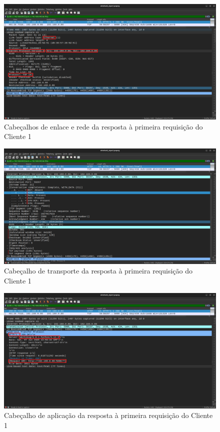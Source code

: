 \documentclass[conference,compsoc]{IEEEtran}
\begin{document}
\begin{otherlanguage}{brazil}
\begin{figure}[!h]
\centering
\includegraphics[width=\columnwidth]{../media/05-server_link_network.png}
\caption{Cabeçalhos de enlace e rede da resposta à primeira requisição do Cliente 1}
\label{fig:link_network_headers}
\end{figure}

\begin{figure}[!h]
\centering
\includegraphics[width=\columnwidth]{../media/06-server_transport.png}
\caption{Cabeçalho de transporte da resposta à primeira requisição do Cliente 1}
\label{fig:transport_header}
\end{figure}

\begin{figure}[!h]
\centering
\includegraphics[width=\columnwidth]{../media/07-server_application.png}
\caption{Cabeçalho de aplicação da resposta à primeira requisição do Cliente 1}
\label{fig:application_header}
\end{figure}


\end{otherlanguage}
\end{document}
